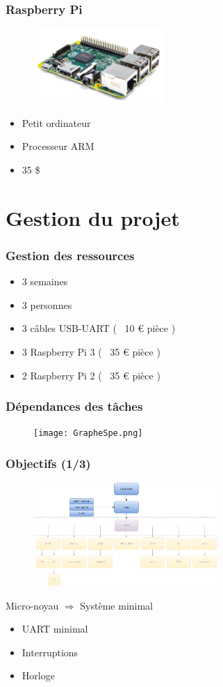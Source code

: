 \documentclass{beamer}
\begin{document}
\begin{frame}
\frametitle{Raspberry Pi}
\begin{figure}[center]
\includegraphics[width=5cm,natwidth=800,natheight=453]{rpi.png}
\end{figure}
\begin{itemize}
\item Petit ordinateur
\item Processeur ARM
\item 35 \$
\end{itemize}
\end{frame}

\section{Gestion du projet}

\begin{frame}
\frametitle{Gestion des ressources}
\begin{itemize}
\item 3 semaines
\item 3 personnes
\item 3 câbles USB-UART ( ~10 \euro{} pièce )
\item 3 Raspberry Pi 3 ( ~35 \euro{} pièce )
\item 2 Raspberry Pi 2 ( ~35 \euro{} pièce )
\end{itemize}
\end{frame}

\begin{frame}
\frametitle{Dépendances des tâches}
\begin{figure}[center]
\texttt{[image: GrapheSpe.png]}
\end{figure}
\end{frame}

\begin{frame}
\frametitle{Objectifs (1/3)}
\begin{figure}[center]
\includegraphics[width=7cm,natwidth=915,natheight=511]{GrapheSpe-1.png}
\end{figure}
Micro-noyau $\Rightarrow$ Système minimal
\begin{itemize}
\item UART minimal
\item Interruptions
\item Horloge
\end{itemize}
\end{frame}
\end{document}
